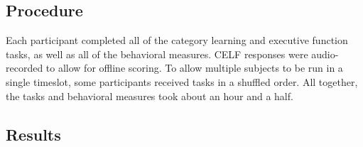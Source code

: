 \documentclass[../dissertation.tex]{subfiles}
\begin{document}
\subsection{Procedure}

Each participant completed all of the category learning and executive function tasks, as well as all of the behavioral measures. CELF responses were audio-recorded to allow for offline scoring. To allow multiple subjects to be run in a single timeslot, some participants received tasks in a shuffled order. All together, the tasks and behavioral measures took about an hour and a half.

\subsection{Results}
\end{document}
